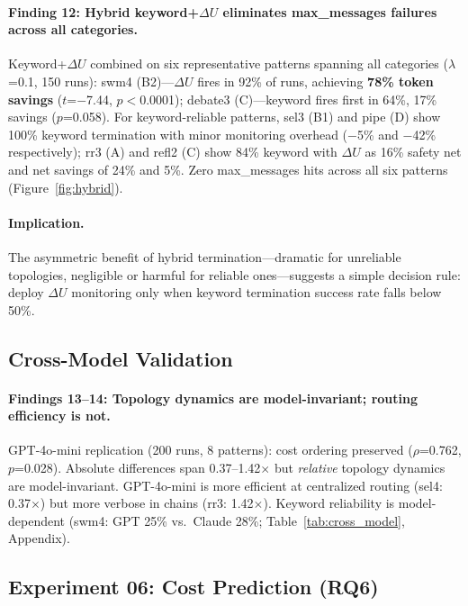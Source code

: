 \documentclass{article}
\begin{document}
\paragraph{Finding 12: Hybrid keyword+$\Delta U$ eliminates max\_messages failures across all categories.} Keyword+$\Delta U$ combined on six representative patterns spanning all categories ($\lambda$=0.1, 150 runs): swm4 (B2)---$\Delta U$ fires in 92\% of runs, achieving \textbf{78\% token savings} ($t$=$-$7.44, $p<$0.0001); debate3 (C)---keyword fires first in 64\%, 17\% savings ($p$=0.058). For keyword-reliable patterns, sel3 (B1) and pipe (D) show 100\% keyword termination with minor monitoring overhead ($-$5\% and $-$42\% respectively); rr3 (A) and refl2 (C) show 84\% keyword with $\Delta U$ as 16\% safety net and net savings of 24\% and 5\%. Zero max\_messages hits across all six patterns (Figure~\ref{fig:hybrid}).

\paragraph{Implication.} The asymmetric benefit of hybrid termination---dramatic for unreliable topologies, negligible or harmful for reliable ones---suggests a simple decision rule: deploy $\Delta U$ monitoring only when keyword termination success rate falls below 50\%.

\subsection{Cross-Model Validation}
\label{sec:cross_model}

\paragraph{Findings 13--14: Topology dynamics are model-invariant; routing efficiency is not.} GPT-4o-mini replication (200 runs, 8 patterns): cost ordering preserved ($\rho$=0.762, $p$=0.028). Absolute differences span 0.37--1.42$\times$ but \emph{relative} topology dynamics are model-invariant. GPT-4o-mini is more efficient at centralized routing (sel4: 0.37$\times$) but more verbose in chains (rr3: 1.42$\times$). Keyword reliability is model-dependent (swm4: GPT 25\% vs.\ Claude 28\%; Table~\ref{tab:cross_model}, Appendix).

\subsection{Experiment 06: Cost Prediction (RQ6)}
\label{sec:exp06}
\end{document}
